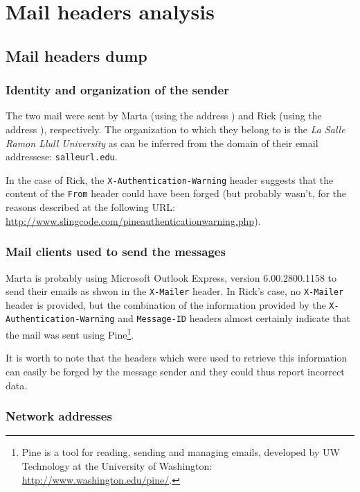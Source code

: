 \section{Mail headers analysis}


\subsection{Mail headers dump}


\subsubsection{Identity and organization of the sender}

The two mail were sent by Marta (using the address ) and Rick (using the address ), respectively. The organization to which they belong to is the \emph{La Salle Ramon Llull University} as can be inferred from the domain of their email addressese: \texttt{salleurl.edu}.

In the case of Rick, the \texttt{X-Authentication-Warning} header suggests that the content of the \texttt{From} header could have been forged (but probably wasn't, for the reasons described at the following URL: \url{http://www.slingcode.com/pineauthenticationwarning.php}).


\subsubsection{Mail clients used to send the messages}

Marta is probably using Microsoft Outlook Express, version 6.00.2800.1158 to send their emails as shwon in the \texttt{X-Mailer} header. In Rick's case, no \texttt{X-Mailer} header is provided, but the combination of the information provided by the \texttt{X-Authentication-Warning} and \texttt{Message-ID} headers almost certainly indicate that the mail was sent using Pine\footnote{Pine is a tool for reading, sending and managing emails, developed by UW Technology at the University of Washington: \url{http://www.washington.edu/pine/}.}.

It is worth to note that the headers which were used to retrieve this information can easily be forged by the message sender and they could thus report incorrect data.


\subsubsection{Network addresses}

